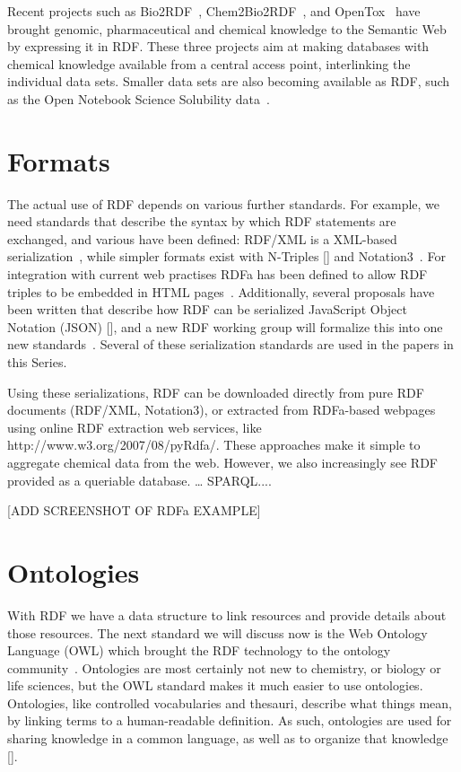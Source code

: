\documentclass[10pt]{bmc_article}
\newenvironment{bmcformat}{\begin{raggedright}\baselineskip20pt\sloppy\setboolean{publ}{false}}{\end{raggedright}\baselineskip20pt\sloppy}
\begin{document}
\begin{bmcformat}
Recent projects such as Bio2RDF~\cite{BEL2008}, Chem2Bio2RDF~\cite{CHE2010},
and OpenTox~\cite{Hardy2010} have brought genomic, pharmaceutical and
chemical knowledge to the Semantic Web by expressing it in RDF.
These three projects aim at making databases with chemical knowledge
available from a central access point, interlinking the individual
data sets. Smaller data sets are also becoming available as RDF, such as
the Open Notebook Science Solubility data~\cite{citeulike:5441072}. 

\section{Formats}

The actual use of RDF depends on various further standards. For example, we need
standards that describe the syntax by which RDF statements are exchanged, and
various have been defined: RDF/XML is a XML-based serialization~\cite{Beckett2004}, while
simpler formats exist with N-Triples [] and Notation3~\cite{BernersLee2006}. For integration with
current web practises RDFa has been defined to allow RDF triples to be embedded
in HTML pages~\cite{RDFA2008}. Additionally, several proposals have been written that
describe how RDF can be serialized JavaScript Object Notation (JSON) [], and
a new RDF working group will formalize this into one new standards~\cite{Herman2010}. Several
of these serialization standards are used in the papers in this Series.

Using these serializations, RDF can be downloaded directly from pure RDF
documents (RDF/XML, Notation3), or extracted from RDFa-based webpages using
online RDF extraction web services, like http://www.w3.org/2007/08/pyRdfa/.
These approaches make it simple to aggregate chemical data from the web.
However, we also increasingly see RDF provided as a queriable database. …
SPARQL....

[ADD SCREENSHOT OF RDFa EXAMPLE]

\section{Ontologies}

With RDF we have a data structure to link resources and provide details about
those resources. The next standard we will discuss now is the Web Ontology
Language (OWL) which brought the RDF technology to the ontology community~\cite{GUN2004}.
Ontologies are most certainly not new to chemistry, or biology or life sciences,
but the OWL standard makes it much easier to use ontologies. Ontologies, like
controlled vocabularies and thesauri, describe what things mean, by linking
terms to a human-readable definition. As such, ontologies are used for sharing
knowledge in a common language, as well as to organize that knowledge []. 


\end{bmcformat}
\end{document}
